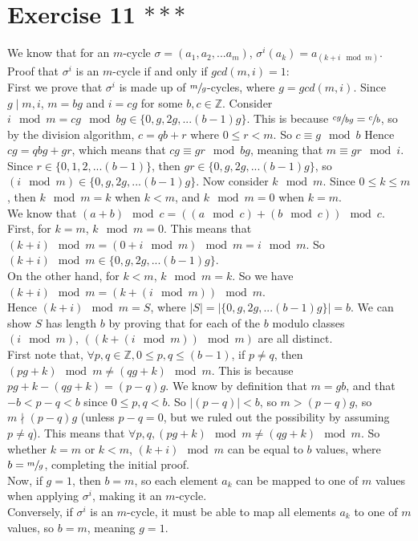 \documentclass[12pt]{article}
\newcommand{\Z}{\mathbb{Z}}
\begin{document}
    \section*{Exercise 11 $***$}
    We know that for an $m$-cycle $\sigma = (a_1, a_2, ... a_m)$,
    $\sigma^i(a_k) = a_{(k+i \mod m)}$.
    Proof that $\sigma^i$ is an $m$-cycle
    if and only if $gcd(m, i) = 1$: \\
    First we prove that $\sigma^i$ is made up of $\sfrac{m}{g}$-cycles,
    where $g = gcd(m, i)$.
    Since $g \mid m, i$, $m = bg$ and $i = cg$ for some $b,c \in \Z$.
    Consider $i \mod m = cg \mod bg \in \{0, g, 2g, ... (b-1)g\}$.
    This is because $\sfrac{cg}{bg} = \sfrac{c}{b}$,
    so by the division algorithm, $c = qb + r$
    where $0 \leqslant r < m$.
    So $c \equiv g \mod b$
    Hence $cg = qbg + gr$,
    which means that $cg \equiv gr \mod bg$, 
    meaning that $m \equiv gr \mod i$.
    Since $r \in \{0, 1, 2, ... (b-1)\}$,
    then $gr \in \{0, g, 2g, ... (b-1)g\}$,
    so $(i \mod m) \in \{0, g, 2g, ... (b-1)g\}$.
    Now consider $k \mod m$.
    Since $0 \leqslant k \leqslant m$,
    then $k \mod m = k$ when $k < m$,
    and $k \mod m = 0$ when $k = m$. \\
    We know that $(a + b) \mod c = ((a \mod c )+ (b \mod c)) \mod c$. \\
    First, for $k = m$, $k \mod m = 0$.
    This means that $(k+i) \mod m = (0 + i \mod m) \mod m = i \mod m$.
    So $(k+i) \mod m \in \{0, g, 2g, ... (b-1)g\}$. \\
    On the other hand, for $k < m$, $k \mod m = k$.
    So we have $(k + i) \mod m = (k + (i \mod m)) \mod m$. \\
    Hence $(k + i) \mod m = S$,
    where $|S| = |\{0, g, 2g, ... (b-1)g\}| = b$.
    We can show $S$ has length $b$ by proving that for each of the
    $b$ modulo classes $(i \mod m)$,  
    $((k + (i \mod m)) \mod m)$ are all distinct.  \\
    First note that, $\forall p, q \in \Z, 0 \leqslant p, q \leqslant (b-1)$,
    if $p \neq q$, then $(pg + k) \mod m \neq (qg + k) \mod m$. 
    This is because $pg + k - (qg + k) = (p - q)g$.
    We know by definition that  $m = gb$, and that $-b < p - q < b$
    since $0 \leqslant p, q < b$. So $|(p-q)| < b$,
    so $m > (p - q)g$,
    so $m \nmid (p - q)g$
    (unless $p - q = 0$, but we ruled out the possibility by assuming
    $p \neq q$).
    This means that $\forall p, q, (pg + k) \mod m \neq (qg + k) \mod m$.
    So whether $k = m$ or $k < m$,
    $(k + i) \mod m$ can be equal to $b$ values,
    where $b = \sfrac{m}{g}$, completing the initial proof. \\ 
    Now, if $g = 1$, then $b = m$, so each element $a_k$ can be mapped to
    one of $m$ values when applying $\sigma^i$, making it an $m$-cycle. \\ 
    Conversely, if $\sigma^i$ is an $m$-cycle, it must be able to map all
    elements $a_k$ to one of $m$ values, so $b = m$, meaning $g = 1$. 
\end{document}
